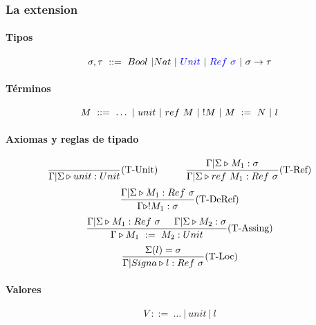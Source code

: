 \subsubsection{La extension}

\paragraph{Tipos}
$$\sigma, \tau ~::=~ Bool~|Nat~|~\color{blue}Unit\color{black}~|~\color{blue}Ref~\sigma\color{black}~|~\sigma\to\tau$$

\paragraph{Términos}

$$ M~::=~ \dots~|~unit~|~ref~M~|~!M~|~M~:=~N~|~    l$$

\paragraph{Axiomas y reglas de tipado}
\begin{equation*}
	\frac{}{\Gamma|\Sigma\triangleright unit : Unit}(\text{T-Unit})\hspace*{1cm}\frac{\Gamma|\Sigma\triangleright M_1 : \sigma}{\Gamma|\Sigma\triangleright ref~M_1 : Ref~\sigma}(\text{T-Ref})
\end{equation*}
\vspace*{5mm}
\begin{equation*}
	\frac{\Gamma|\Sigma\triangleright M_1 : Ref~\sigma}{\Gamma\triangleright !M_1 : \sigma}(\text{T-DeRef})
\end{equation*}
\vspace*{5mm}
\begin{equation*}
	\frac{\Gamma|\Sigma\triangleright M_1 : Ref~\sigma\hspace*{5mm}\Gamma|\Sigma\triangleright M_2 : \sigma}{\Gamma\triangleright M_1~:=~M_2 : Unit}(\text{T-Assing})
\end{equation*}
\vspace*{5mm}
\begin{equation*}
	\frac{\Sigma(l) = \sigma}{\Gamma|Signa\triangleright l : Ref~\sigma}(\text{T-Loc})
\end{equation*}

\paragraph{Valores}
$$V~::=~\dots~|~unit~|~l$$

